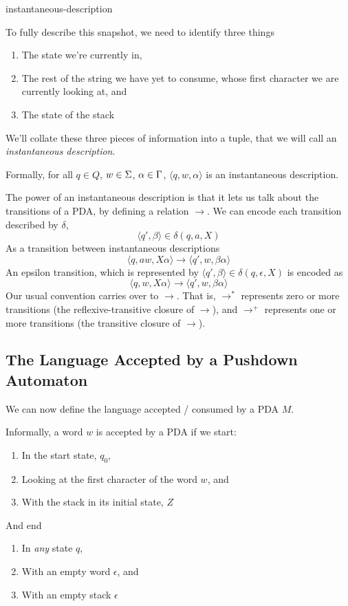 \begin{center}
    {instantaneous-description}
\end{center}

To fully describe this snapshot, we need to identify three things
\begin{enumerate}
    \item The state we're currently in,
    \item The rest of the string we have yet to consume, whose first character we are currently looking at, and
    \item The state of the stack
\end{enumerate}

We'll collate these three pieces of information into a tuple, that we will call an \textit{instantaneous description}.

Formally, for all $q \in Q$, $w \in \Sigma\*$, $\alpha \in \Gamma\*$, $\langle q, w, \alpha \rangle$ is an instantaneous description.

The power of an instantaneous description is that it lets us talk about the transitions of a PDA, by defining a relation $\rightarrow$. We can encode each transition described by $\delta$,
\[\langle q', \beta \rangle \in \delta(q, a, X)\]
As a transition between instantaneous descriptions
\[\langle q, aw, X\alpha \rangle \rightarrow \langle q', w, \beta\alpha \rangle\]
An epsilon transition, which is represented by $\langle q', \beta \rangle \in \delta(q, \epsilon, X)$ is encoded as
\[\langle q, w, X\alpha \rangle \rightarrow \langle q', w, \beta\alpha \rangle\]
Our usual convention carries over to $\rightarrow$. That is, $\rightarrow^{*}$ represents zero or more transitions (the reflexive-transitive closure of $\rightarrow$), and $\rightarrow^{+}$ represents one or more transitions (the transitive closure of $\rightarrow$).

\subsection{The Language Accepted by a Pushdown Automaton}
We can now define the language accepted / consumed by a PDA $M$.

Informally, a word $w$ is accepted by a PDA if we start:
\begin{enumerate}
    \item In the start state, $q_0$,
    \item Looking at the first character of the word $w$, and
    \item With the stack in its initial state, $Z$
\end{enumerate}
And end 
\begin{enumerate}
    \item In \textit{any} state $q$,
    \item With an empty word $\epsilon$, and
    \item With an empty stack $\epsilon$
\end{enumerate}

